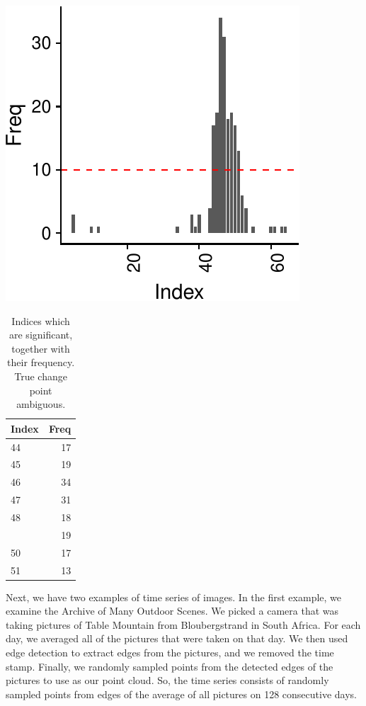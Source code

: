 \documentclass[smallextended]{svjour3}       %
\begin{document}
\begin{center}\includegraphics{springer_template_files/figure-latex/chunk_7_5-1} \end{center}

\begin{longtable}[t]{lr}
\caption{\label{tab:unnamed-chunk-3}Indices which are significant, together with their frequency. True change point ambiguous.}\\
\toprule
Index & Freq\\
\midrule
44 & 17\\
45 & 19\\
46 & 34\\
47 & 31\\
48 & 18\\
\addlinespace
49 & 19\\
50 & 17\\
51 & 13\\
\bottomrule
\end{longtable}

Next, we have two examples of time series of images. In the first
example, we examine the Archive of Many Outdoor Scenes. We picked a
camera that was taking pictures of Table Mountain from Bloubergstrand in
South Africa. For each day, we averaged all of the pictures that were
taken on that day. We then used edge detection to extract edges from the
pictures, and we removed the time stamp. Finally, we randomly sampled
points from the detected edges of the pictures to use as our point
cloud. So, the time series consists of randomly sampled points from
edges of the average of all pictures on 128 consecutive days.
\end{document}
